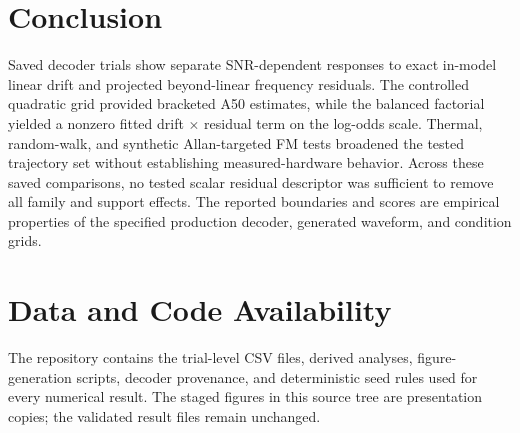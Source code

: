\documentclass[conference]{IEEEtran}
\begin{document}
\section{Conclusion}
Saved decoder trials show separate SNR-dependent responses to exact in-model linear drift and projected beyond-linear frequency residuals. The controlled quadratic grid provided bracketed A50 estimates, while the balanced factorial yielded a nonzero fitted drift $\times$ residual term on the log-odds scale. Thermal, random-walk, and synthetic Allan-targeted FM tests broadened the tested trajectory set without establishing measured-hardware behavior. Across these saved comparisons, no tested scalar residual descriptor was sufficient to remove all family and support effects. The reported boundaries and scores are empirical properties of the specified production decoder, generated waveform, and condition grids.

\section*{Data and Code Availability}
The repository contains the trial-level CSV files, derived analyses, figure-generation scripts, decoder provenance, and deterministic seed rules used for every numerical result. The staged figures in this source tree are presentation copies; the validated result files remain unchanged.



\end{document}

